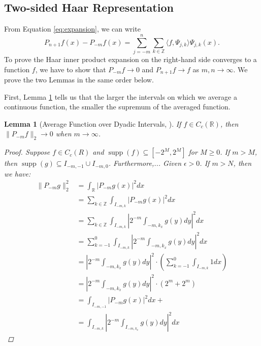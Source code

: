\documentclass[11pt]{amsart}
\newcommand{\change}[1]{\todo[linecolor=Plum,backgroundcolor=Plum!25,bordercolor=Plum]{#1}}
\theoremstyle{theorem} %
\newtheorem{lem}[thm]{Lemma} %
\theoremstyle{definition}
\theoremstyle{example}
\theoremstyle{remark}
\numberwithin{equation}{section}
\newcommand{\R}{\mathbb{R}}
\newcommand{\Z}{\mathbb{Z}}
\DeclareMathOperator*{\supp}{supp}
\begin{document}
\subsection{Two-sided Haar Representation}
From Equation \ref{eq:expansion}, we can write
\begin{equation} \label{eq:twosided}
	P_{n+1}f(x) - P_{-m}f(x) = \sum_{j=-m}^{n} \sum_{k \in \Z} \langle f, \varPsi_{j,k} \rangle \varPsi_{j,k}(x).
\end{equation}
To prove the Haar inner product expansion on the right-hand side converges to a function $ f $, we have to show that $ P_{-m}f \to 0 $ and  $ P_{n+1}f \to f $ as $ m, n \to \infty $. We prove the two Lemmas in the same order below.

First, Lemma \ref{lem:average} tells us that the larger the intervals on which we average a continuous function, the smaller the supremum of the averaged function.

\begin{lem}[Average Function over Dyadic Intervals, {\cite[295]{pinsky}}] \label{lem:average}
	If $ f \in C_c(\R) $, then $ \|P_{-m}f\|_2 \to 0 $ when $ m \to \infty $.
	\begin{proof}\change{Fill in later}
		Suppose $ f \in C_c(R) $ and $ \supp(f) \subseteq [-2^M, 2^M] $ for $ M \geq 0 $. If $ m > M $, then 
		$ \supp(g) \subseteq I_{-m,-1} \cup I_{-m,0} $. Furthermore,... Given $ \epsilon > 0 $. If $ m > N $, then we have:
		\begin{align*}
			\| P_{-m}g \|_2^2 &= \int_{\R} \left| P_{-m}g(x) \right|^2 dx \\
			&= \sum_{k \in \Z} \int_{I_{-m,k}} \left| P_{-m}g(x) \right|^2 dx \\
			&= \sum_{k \in \Z} \int_{I_{-m,k}} \left| 2^{-m} \int_{-m,k_x} g(y) dy \right|^2 dx \\
			&= \sum_{k = -1}^{0} \int_{I_{-m,k}} \left| 2^{-m} \int_{-m,k_x} g(y) dy \right|^2 dx \\
			&= \left| 2^{-m} \int_{-m,k_x} g(y) dy \right|^2 \cdot \left(  \sum_{k = -1}^{0} \int_{I_{-m,k}} 1 dx \right) \\
			&= \left| 2^{-m} \int_{-m,k_x} g(y) dy \right|^2 \cdot (2^{m} + 2^{m}) \\
			&= \int_{I_{-m,-1}} \left| P_{-m}g(x) \right|^2 dx +   \\
			&= \int_{I_{-m,k}} \left| 2^{-m} \int_{I_{-m,k_x}} g(y) dy \right|^2 dx
		\end{align*}
	\end{proof}
\end{lem}
\end{document}
